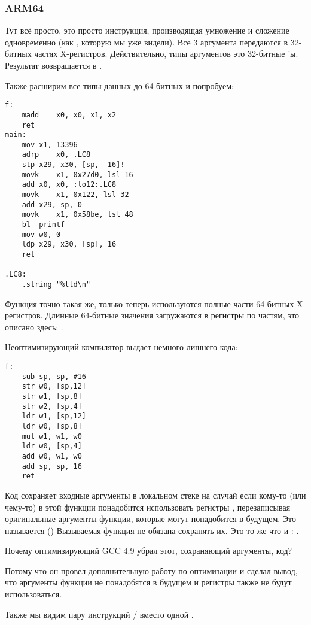 \subsubsection{ARM64}


Тут всё просто.
 это просто инструкция, производящая умножение и сложение одновременно (как , 
которую мы уже видели).
Все 3 аргумента передаются в 32-битных частях X-регистров.
Действительно, типы аргументов это 32-битные 'ы.
Результат возвращается в .



Также расширим все типы данных до 64-битных  и попробуем:



\begin{lstlisting}[style=customasmARM]
f:
	madd	x0, x0, x1, x2
	ret
main:
	mov	x1, 13396
	adrp	x0, .LC8
	stp	x29, x30, [sp, -16]!
	movk	x1, 0x27d0, lsl 16
	add	x0, x0, :lo12:.LC8
	movk	x1, 0x122, lsl 32
	add	x29, sp, 0
	movk	x1, 0x58be, lsl 48
	bl	printf
	mov	w0, 0
	ldp	x29, x30, [sp], 16
	ret

.LC8:
	.string	"%lld\n"
\end{lstlisting}

Функция \ttf{} точно такая же, только теперь используются полные части 64-битных X-регистров.
Длинные 64-битные значения загружаются в регистры по частям, это описано здесь: .


Неоптимизирующий компилятор выдает немного лишнего кода:

\begin{lstlisting}[style=customasmARM]
f:
	sub	sp, sp, #16
	str	w0, [sp,12]
	str	w1, [sp,8]
	str	w2, [sp,4]
	ldr	w1, [sp,12]
	ldr	w0, [sp,8]
	mul	w1, w1, w0
	ldr	w0, [sp,4]
	add	w0, w1, w0
	add	sp, sp, 16
	ret
\end{lstlisting}

Код сохраняет входные аргументы в локальном стеке на случай если кому-то (или чему-то) в этой функции
понадобится использовать регистры , перезаписывая оригинальные аргументы функции, которые
могут понадобится в будущем.
Это называется  (\ARMPCS)
Вызываемая функция не обязана сохранять их.
Это то же что и : .

Почему оптимизирующий GCC 4.9 убрал этот, сохраняющий аргументы, код?

Потому что он провел дополнительную работу по оптимизации и сделал вывод, 
что аргументы функции не понадобятся в будущем и регистры  также не будут использоваться.

Также мы видим пару инструкций / вместо одной .

